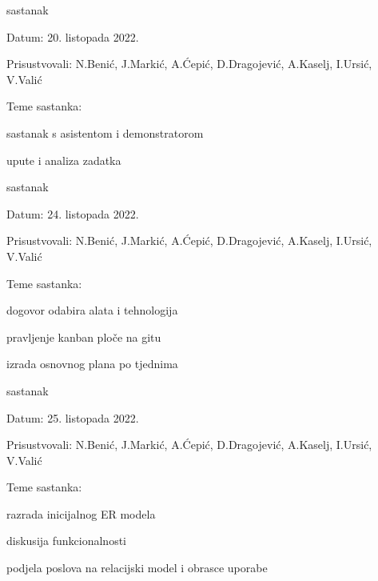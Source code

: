 			\begin{packed_enum}
				\item  sastanak
				
				\item[] \begin{packed_item}
					\item Datum: 20. listopada 2022.
					\item Prisustvovali: N.Benić, J.Markić, A.Ćepić, D.Dragojević, A.Kaselj, I.Ursić, V.Valić
					\item Teme sastanka:
					\begin{packed_item}
						\item  sastanak s asistentom i demonstratorom
						\item  upute i analiza zadatka
					\end{packed_item}
				\end{packed_item}
				
				\item  sastanak
				\item[] \begin{packed_item}
					\item Datum: 24. listopada 2022.
					\item Prisustvovali: N.Benić, J.Markić, A.Ćepić, D.Dragojević, A.Kaselj, I.Ursić, V.Valić
					\item Teme sastanka:
					\begin{packed_item}
						\item  dogovor odabira alata i tehnologija
						\item  pravljenje kanban ploče na gitu
						\item  izrada osnovnog plana po tjednima
					\end{packed_item}
				\end{packed_item}
			
				\item  sastanak
				\item[] \begin{packed_item}
					\item Datum: 25. listopada 2022.
					\item Prisustvovali: N.Benić, J.Markić, A.Ćepić, D.Dragojević, A.Kaselj, I.Ursić, V.Valić
					\item Teme sastanka:
					\begin{packed_item}
						\item  razrada inicijalnog ER modela
						\item  diskusija funkcionalnosti
						\item  podjela poslova na relacijski model i obrasce uporabe
					\end{packed_item}
				\end{packed_item}
			

\end{packed_enum}
